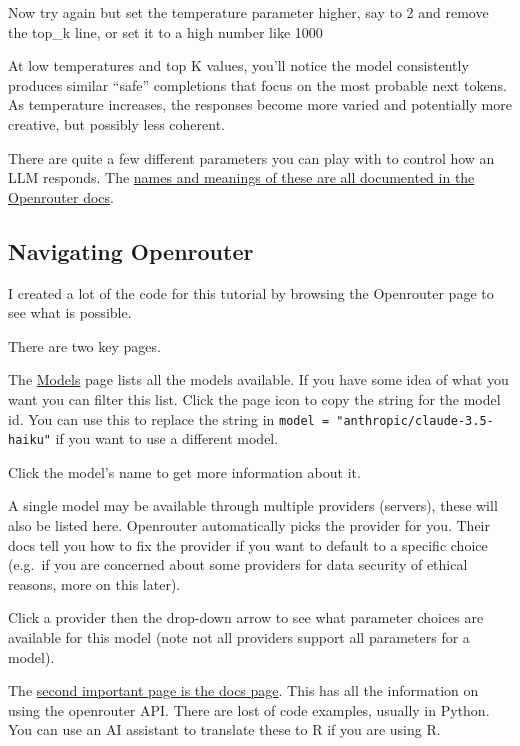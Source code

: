 \documentclass[
  letterpaper,
  DIV=11,
  numbers=noendperiod]{scrreprt}
\begin{document}
Now try again but set the temperature parameter higher, say to 2 and
remove the top\_k line, or set it to a high number like 1000

At low temperatures and top K values, you'll notice the model
consistently produces similar ``safe'' completions that focus on the
most probable next tokens. As temperature increases, the responses
become more varied and potentially more creative, but possibly less
coherent.

There are quite a few different parameters you can play with to control
how an LLM responds. The
\href{https://openrouter.ai/docs/api-reference/parameters}{names and
meanings of these are all documented in the Openrouter docs}.

\subsection{Navigating Openrouter}\label{navigating-openrouter}

I created a lot of the code for this tutorial by browsing the Openrouter
page to see what is possible.

There are two key pages.

The \href{https://openrouter.ai/models}{Models} page lists all the
models available. If you have some idea of what you want you can filter
this list. Click the page icon to copy the string for the model id. You
can use this to replace the string in
\texttt{model\ =\ "anthropic/claude-3.5-haiku"} if you want to use a
different model.

Click the model's name to get more information about it.

A single model may be available through multiple providers (servers),
these will also be listed here. Openrouter automatically picks the
provider for you. Their docs tell you how to fix the provider if you
want to default to a specific choice (e.g.~if you are concerned about
some providers for data security of ethical reasons, more on this
later).

Click a provider then the drop-down arrow to see what parameter choices
are available for this model (note not all providers support all
parameters for a model).

The \href{https://openrouter.ai/docs/quickstart}{second important page
is the docs page}. This has all the information on using the openrouter
API. There are lost of code examples, usually in Python. You can use an
AI assistant to translate these to R if you are using R.
\end{document}
